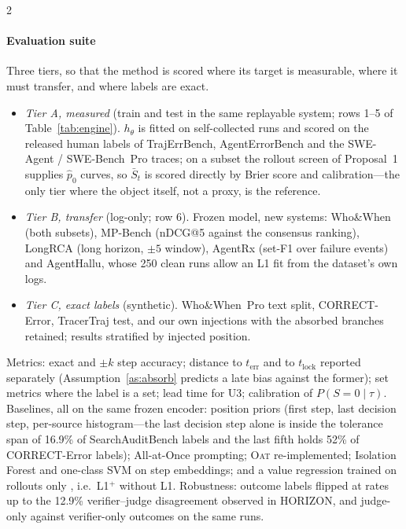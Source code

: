 \begin{multicols}{2}
\paragraph{Evaluation suite} Three tiers, so that the method is scored where its target is measurable, where it must transfer, and where labels are exact.
\begin{itemize}[leftmargin=1.1em]
\item \emph{Tier A, measured} (train and test in the same replayable system; rows 1--5 of Table~\ref{tab:engine}). $h_\theta$ is fitted on self-collected runs and scored on the released human labels of TrajErrBench, AgentErrorBench and the SWE-Agent / SWE-Bench~Pro traces; on a subset the rollout screen of Proposal~1 supplies $\hat p_0$ curves, so $\bar S_t$ is scored directly by Brier score and calibration---the only tier where the object itself, not a proxy, is the reference.
\item \emph{Tier B, transfer} (log-only; row 6). Frozen model, new systems: Who\&When (both subsets), MP-Bench (nDCG@5 against the consensus ranking), LongRCA (long horizon, $\pm5$ window), AgentRx (set-F1 over failure events) and AgentHallu, whose 250 clean runs allow an L1 fit from the dataset's own logs.
\item \emph{Tier C, exact labels} (synthetic). Who\&When~Pro text split, CORRECT-Error, TracerTraj test, and our own injections with the absorbed branches retained; results stratified by injected position.
\end{itemize}
Metrics: exact and $\pm k$ step accuracy; distance to $t_{\mathrm{err}}$ and to $t_{\mathrm{lock}}$ reported separately (Assumption~\ref{as:absorb} predicts a late bias against the former); set metrics where the label is a set; lead time for U3; calibration of $P(S{=}0\mid\tau)$. Baselines, all on the same frozen encoder: position priors (first step, last decision step, per-source histogram---the last decision step alone is inside the tolerance span of 16.9\% of SearchAuditBench labels and the last fifth holds 52\% of CORRECT-Error labels); All-at-Once prompting; \textsc{Oat} re-implemented; Isolation Forest and one-class SVM on step embeddings; and a value regression trained on rollouts only \cite{wang2024mathshepherd}, i.e.\ L1$^{+}$ without L1. Robustness: outcome labels flipped at rates up to the 12.9\% verifier--judge disagreement observed in HORIZON, and judge-only against verifier-only outcomes on the same runs.


\end{multicols}
